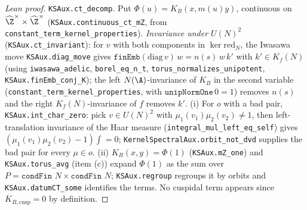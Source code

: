 \begin{proof}[Lean proof]
\texttt{KSAux.ct\_decomp}. Put $\Phi(u)=K_B(x,m(u)y)$, continuous on $\widehat{\Z}^\times\times\widehat{\Z}^\times$ (\texttt{KSAux.continuous\_ct\_mZ}, from \texttt{constant\_term\_kernel\_properties}). \emph{Invariance under $U(N)^2$} (\texttt{KSAux.ct\_invariant}): for $v$ with both components in $\ker\mathrm{red}_N$, the Iwasawa move \texttt{KSAux.diag\_move} gives $\mathtt{finEmb}(\mathrm{diag}\,v)\,w=n(s)\,w\,k'$ with $k'\in K_f(N)$ (using \texttt{iwasawa\_adelic}, \texttt{borel\_eq\_n\_t}, \texttt{torus\_normalizes\_unipotent}, \texttt{KSAux.finEmb\_conj\_K}); the left $N(\A)$-invariance of $K_B$ in the second variable (\texttt{constant\_term\_kernel\_properties}, with $\mathtt{unipNormOne}\,0=1$) removes $n(s)$ and the right $K_f(N)$-invariance of $f$ removes $k'$. (i) For $o$ with a bad pair, \texttt{KSAux.int\_char\_zero}: pick $v\in U(N)^2$ with $\mu_1(v_1)\mu_2(v_2)\ne1$, then left-translation invariance of the Haar measure (\texttt{integral\_mul\_left\_eq\_self}) gives $(\mu_1(v_1)\mu_2(v_2)-1)\int=0$; \texttt{KernelSpectralAux.orbit\_not\_dvd} supplies the bad pair for every $\mu\in o$. (ii) $K_B(x,y)=\Phi(1)$ (\texttt{KSAux.mZ\_one}) and \texttt{KSAux.torus\_avg} (item (c)) expand $\Phi(1)$ as the sum over $P=\texttt{condFin }N\times\texttt{condFin }N$; \texttt{KSAux.regroup} regroups it by orbits and \texttt{KSAux.datumCT\_some} identifies the terms. No cuspidal term appears since $K_{B,\mathrm{cusp}}=0$ by definition.
\end{proof}

